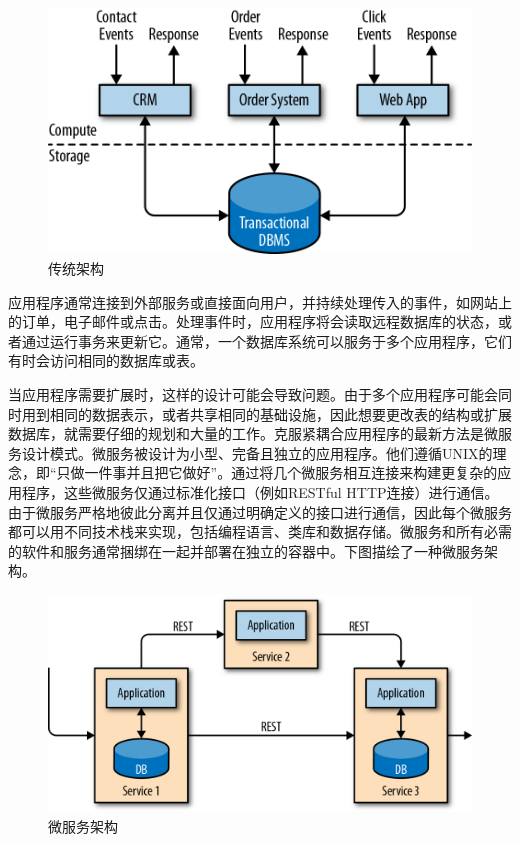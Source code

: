 \documentclass[cn,11pt,chinese]{elegantbook}
\begin{document}
\begin{figure}
\centering
\includegraphics{images/spaf_0101.png}
\caption{传统架构}
\end{figure}

应用程序通常连接到外部服务或直接面向用户，并持续处理传入的事件，如网站上的订单，电子邮件或点击。处理事件时，应用程序将会读取远程数据库的状态，或者通过运行事务来更新它。通常，一个数据库系统可以服务于多个应用程序，它们有时会访问相同的数据库或表。

当应用程序需要扩展时，这样的设计可能会导致问题。由于多个应用程序可能会同时用到相同的数据表示，或者共享相同的基础设施，因此想要更改表的结构或扩展数据库，就需要仔细的规划和大量的工作。克服紧耦合应用程序的最新方法是微服务设计模式。微服务被设计为小型、完备且独立的应用程序。他们遵循UNIX的理念，即``只做一件事并且把它做好''。通过将几个微服务相互连接来构建更复杂的应用程序，这些微服务仅通过标准化接口（例如RESTful
HTTP连接）进行通信。由于微服务严格地彼此分离并且仅通过明确定义的接口进行通信，因此每个微服务都可以用不同技术栈来实现，包括编程语言、类库和数据存储。微服务和所有必需的软件和服务通常捆绑在一起并部署在独立的容器中。下图描绘了一种微服务架构。

\begin{figure}
\centering
\includegraphics{images/spaf_0102.png}
\caption{微服务架构}
\end{figure}
\end{document}
